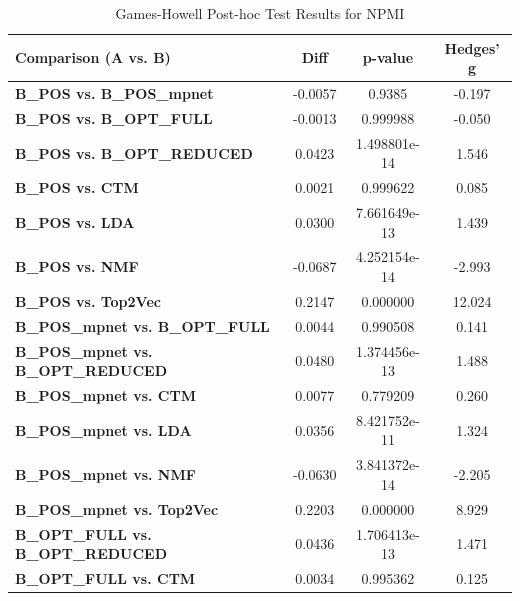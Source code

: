 \begin{table}[ht]
    \centering
    \caption{Games-Howell Post-hoc Test Results for NPMI}
    \label{tab:games_howell_npmi}
    \begin{tabular}{lccc}
        \toprule
        \textbf{Comparison (A vs. B)}              & \textbf{Diff} & \textbf{p-value} & \textbf{Hedges' g} \\
        \midrule
        \textbf{B\_POS vs. B\_POS\_mpnet}          & -0.0057       & 0.9385           & -0.197             \\
        \textbf{B\_POS vs. B\_OPT\_FULL}           & -0.0013       & 0.999988         & -0.050             \\
        \textbf{B\_POS vs. B\_OPT\_REDUCED}        & 0.0423        & 1.498801e-14     & 1.546              \\
        \textbf{B\_POS vs. CTM}                    & 0.0021        & 0.999622         & 0.085              \\
        \textbf{B\_POS vs. LDA}                    & 0.0300        & 7.661649e-13     & 1.439              \\
        \textbf{B\_POS vs. NMF}                    & -0.0687       & 4.252154e-14     & -2.993             \\
        \textbf{B\_POS vs. Top2Vec}                & 0.2147        & 0.000000         & 12.024             \\
        \textbf{B\_POS\_mpnet vs. B\_OPT\_FULL}    & 0.0044        & 0.990508         & 0.141              \\
        \textbf{B\_POS\_mpnet vs. B\_OPT\_REDUCED} & 0.0480        & 1.374456e-13     & 1.488              \\
        \textbf{B\_POS\_mpnet vs. CTM}             & 0.0077        & 0.779209         & 0.260              \\
        \textbf{B\_POS\_mpnet vs. LDA}             & 0.0356        & 8.421752e-11     & 1.324              \\
        \textbf{B\_POS\_mpnet vs. NMF}             & -0.0630       & 3.841372e-14     & -2.205             \\
        \textbf{B\_POS\_mpnet vs. Top2Vec}         & 0.2203        & 0.000000         & 8.929              \\
        \textbf{B\_OPT\_FULL vs. B\_OPT\_REDUCED}  & 0.0436        & 1.706413e-13     & 1.471              \\
        \textbf{B\_OPT\_FULL vs. CTM}              & 0.0034        & 0.995362         & 0.125              \\

\end{tabular}
\end{table}
